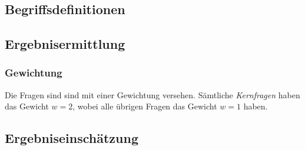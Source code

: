 \documentclass[a4paper,11pt,twoside]{article} %
\begin{document}
\subsection{Begriffsdefinitionen}

\subsection{Ergebnisermittlung}
\subsubsection{Gewichtung}
Die Fragen sind sind mit einer Gewichtung versehen. Sämtliche \emph{Kernfragen} haben das Gewicht \(w = 2\), wobei alle übrigen Fragen das Gewicht \(w = 1\) haben.  
\subsection{Ergebniseinschätzung}
\end{document}

